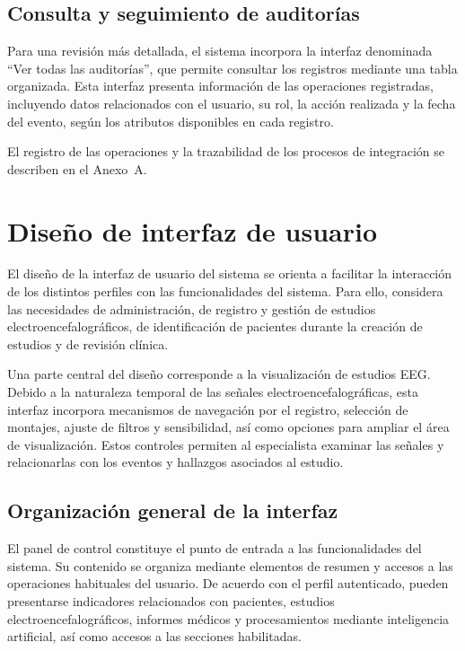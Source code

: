 \subsection{Consulta y seguimiento de auditorías}
\label{subsec:consulta-seguimiento-auditorias}

Para una revisión más detallada, el sistema incorpora la interfaz denominada ``Ver todas las auditorías'', que permite consultar los registros mediante una tabla organizada. Esta interfaz presenta información de las operaciones registradas, incluyendo datos relacionados con el usuario, su rol, la acción realizada y la fecha del evento, según los atributos disponibles en cada registro.

\begin{nuevotexto}
El registro de las operaciones y la trazabilidad de los procesos de integración se describen en el Anexo~A.
\end{nuevotexto}

\section{Diseño de interfaz de usuario}
\label{sec:diseno-interfaz-usuario}

El diseño de la interfaz de usuario del sistema se orienta a facilitar la interacción de los distintos perfiles con las funcionalidades del sistema. Para ello, considera las necesidades de administración, de registro y gestión de estudios electroencefalográficos, de identificación de pacientes durante la creación de estudios y de revisión clínica.

Una parte central del diseño corresponde a la
visualización de estudios EEG. Debido a la naturaleza
temporal de las señales electroencefalográficas,
esta interfaz incorpora mecanismos de navegación
por el registro, selección de montajes, ajuste de
filtros y sensibilidad, así como opciones para ampliar
el área de visualización. Estos controles permiten
al especialista examinar las señales y relacionarlas
con los eventos y hallazgos asociados al estudio.

\subsection{Organización general de la interfaz}
\label{subsec:organizacion-general-interfaz}

El panel de control constituye el punto de entrada
a las funcionalidades del sistema. Su contenido
se organiza mediante elementos de resumen y accesos
a las operaciones habituales del usuario. De acuerdo
con el perfil autenticado, pueden presentarse
indicadores relacionados con pacientes, estudios
electroencefalográficos, informes médicos y
procesamientos mediante inteligencia artificial,
así como accesos a las secciones habilitadas.

